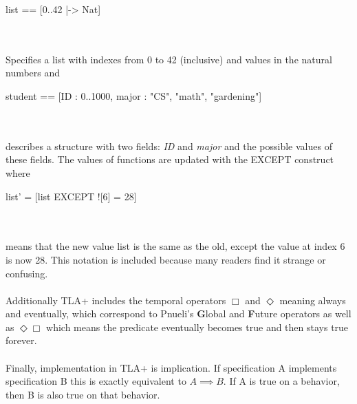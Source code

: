 \documentclass{uit-thesis}
\begin{document}
\begin{tla}
    list == [0..42 |-> Nat]
\end{tla}
\begin{tlatex}
%
\end{tlatex}
\\\\
Specifies a list with indexes from 0 to 42 (inclusive) and values in the natural numbers and
\begin{tla}
    student == [ID : 0..1000, major : {"CS", "math", "gardening"}]
\end{tla}
\begin{tlatex}
\end{tlatex}
\\\\
describes a structure with two fields: \textit{ID} and \textit{major} and the possible values of these fields. The values of functions are updated with the EXCEPT construct where 
\begin{tla}
    list' = [list EXCEPT ![6] = 28]
\end{tla}
\begin{tlatex}
%
\end{tlatex}
\\\\
means that the new value list is the same as the old, except the value at index 6 is now 28. This notation is included because many readers find it strange or confusing.
\\\\
Additionally TLA+ includes the temporal operators $\Box$ and $\Diamond$ meaning always and eventually, which correspond to Pnueli's \textbf{G}lobal and \textbf{F}uture operators as well as $\Diamond\Box$ which means the predicate eventually becomes true and then stays true forever.
\\\\
Finally, implementation in TLA+ is implication. If specification A implements specification B this is exactly equivalent to $A \implies B$. If A is true on a behavior, then B is also true on that behavior.
\end{document}
